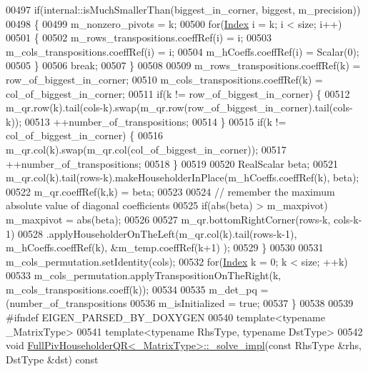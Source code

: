 \begin{DoxyCode}
00497     \textcolor{keywordflow}{if}(internal::isMuchSmallerThan(biggest\_in\_corner, biggest, m\_precision))
00498     \{
00499       m\_nonzero\_pivots = k;
00500       \textcolor{keywordflow}{for}(\hyperlink{namespace_eigen_a62e77e0933482dafde8fe197d9a2cfde}{Index} i = k; i < size; i++)
00501       \{
00502         m\_rows\_transpositions.coeffRef(i) = i;
00503         m\_cols\_transpositions.coeffRef(i) = i;
00504         m\_hCoeffs.coeffRef(i) = Scalar(0);
00505       \}
00506       \textcolor{keywordflow}{break};
00507     \}
00508 
00509     m\_rows\_transpositions.coeffRef(k) = row\_of\_biggest\_in\_corner;
00510     m\_cols\_transpositions.coeffRef(k) = col\_of\_biggest\_in\_corner;
00511     \textcolor{keywordflow}{if}(k != row\_of\_biggest\_in\_corner) \{
00512       m\_qr.row(k).tail(cols-k).swap(m\_qr.row(row\_of\_biggest\_in\_corner).tail(cols-k));
00513       ++number\_of\_transpositions;
00514     \}
00515     \textcolor{keywordflow}{if}(k != col\_of\_biggest\_in\_corner) \{
00516       m\_qr.col(k).swap(m\_qr.col(col\_of\_biggest\_in\_corner));
00517       ++number\_of\_transpositions;
00518     \}
00519 
00520     RealScalar beta;
00521     m\_qr.col(k).tail(rows-k).makeHouseholderInPlace(m\_hCoeffs.coeffRef(k), beta);
00522     m\_qr.coeffRef(k,k) = beta;
00523 
00524     \textcolor{comment}{// remember the maximum absolute value of diagonal coefficients}
00525     \textcolor{keywordflow}{if}(abs(beta) > m\_maxpivot) m\_maxpivot = abs(beta);
00526 
00527     m\_qr.bottomRightCorner(rows-k, cols-k-1)
00528         .applyHouseholderOnTheLeft(m\_qr.col(k).tail(rows-k-1), m\_hCoeffs.coeffRef(k), &m\_temp.coeffRef(k+1)
      );
00529   \}
00530 
00531   m\_cols\_permutation.setIdentity(cols);
00532   \textcolor{keywordflow}{for}(\hyperlink{namespace_eigen_a62e77e0933482dafde8fe197d9a2cfde}{Index} k = 0; k < size; ++k)
00533     m\_cols\_permutation.applyTranspositionOnTheRight(k, m\_cols\_transpositions.coeff(k));
00534 
00535   m\_det\_pq = (number\_of\_transpositions%
00536   m\_isInitialized = \textcolor{keyword}{true};
00537 \}
00538 
00539 \textcolor{preprocessor}{#ifndef EIGEN\_PARSED\_BY\_DOXYGEN}
00540 \textcolor{keyword}{template}<\textcolor{keyword}{typename} \_MatrixType>
00541 \textcolor{keyword}{template}<\textcolor{keyword}{typename} RhsType, \textcolor{keyword}{typename} DstType>
00542 \textcolor{keywordtype}{void} \hyperlink{group___q_r___module_class_eigen_1_1_full_piv_householder_q_r}{FullPivHouseholderQR<\_MatrixType>::\_solve\_impl}(\textcolor{keyword}{const} 
      RhsType &rhs, DstType &dst)\textcolor{keyword}{ const}

\end{DoxyCode}
